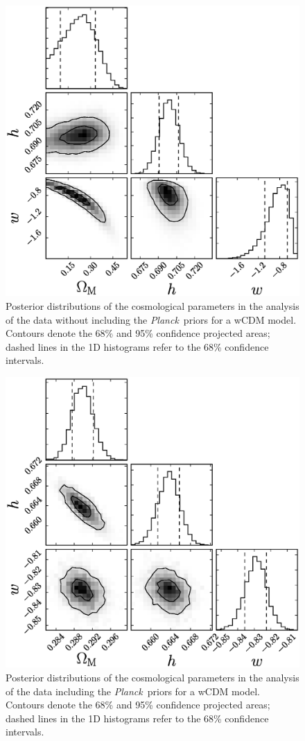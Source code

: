 \documentclass[12pt,a4paper]{article}
\newcommand\Planck{{\it Planck}\ }
\begin{document}
\begin{figure}
  \centering
  \includegraphics[width=0.5\linewidth]{figures/betoule_wcdm_noprior_corner.eps}
  \caption{Posterior distributions of the cosmological parameters in the
    analysis of the \citet{betoule2014} data without including the
    \Planck priors for a wCDM model. Contours denote the
    68\% and 95\% confidence projected areas; dashed lines in
    the 1D histograms refer to the 68\% confidence intervals.}
  \label{fig:betoule_wcdm_noprior_corner}
\end{figure}
%
\begin{figure}
  \centering
  \includegraphics[width=0.5\linewidth]{figures/betoule_wcdm_withprior_corner.eps}
  \caption{Posterior distributions of the cosmological parameters in the
    analysis of the \citet{betoule2014} data including the
    \Planck priors for a wCDM model. Contours denote the
    68\% and 95\% confidence projected areas; dashed lines in
    the 1D histograms refer to the 68\% confidence intervals.}
  \label{fig:betoule_wcdm_withprior_corner}
\end{figure}
\end{document}
